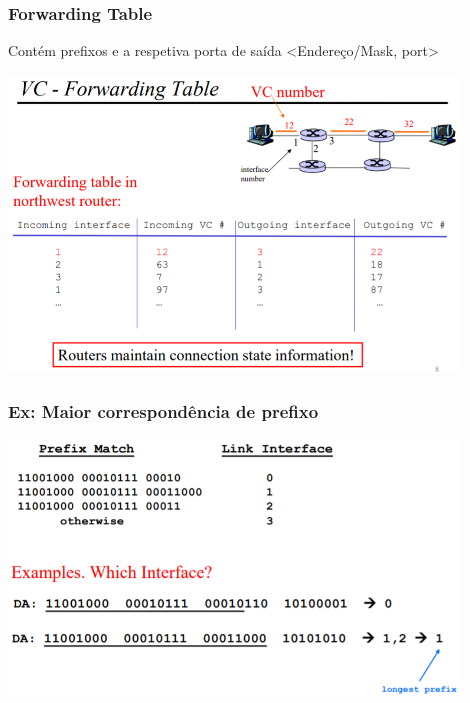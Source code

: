 \documentclass[../resumosRCOM.tex]{subfiles}
\begin{document}
\subsubsection{Forwarding Table}
Contém prefixos e a respetiva porta de saída <Endereço/Mask, port>
\begin{center} 
    \includegraphics[width=12cm]{images/RCOM1.png}
\end{center}
\subsubsection{Ex: Maior correspondência de prefixo}
\begin{center}            
    \includegraphics[width=12cm]{images/RCOM4.png}
\end{center}
\end{document}
